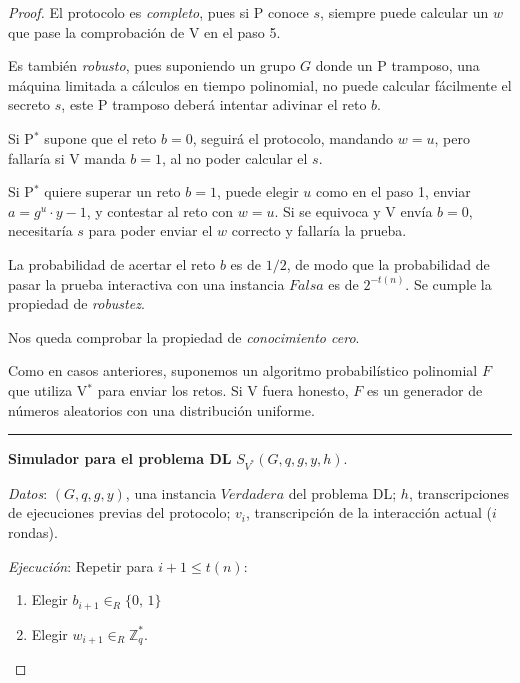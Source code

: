 \begin{proof}
	\hfil
	
	El protocolo es \textit{completo}, pues si P conoce $s$, siempre puede calcular un $w$ que pase la comprobación de V en el paso 5.
	
	\hfil
	
	Es también \textit{robusto}, pues suponiendo un grupo $G$ donde un P tramposo, una máquina limitada a cálculos en tiempo polinomial, no puede calcular fácilmente el secreto $s$, este P tramposo deberá intentar adivinar el reto $b$.
	
	Si P$^*$ supone que el reto $b=0$, seguirá el protocolo, mandando $w=u$, pero fallaría si V manda $b=1$, al no poder calcular el $s$.
	
	Si P$^*$ quiere superar un reto $b=1$, puede elegir $u$ como en el paso 1, enviar $a=g^u \cdot y-1$, y contestar al reto con $w=u$. Si se equivoca y V envía $b=0$, necesitaría $s$ para poder enviar el $w$ correcto y fallaría la prueba.
	
	La probabilidad de acertar el reto $b$ es de $1/2$, de modo que la probabilidad de pasar la prueba interactiva con una instancia $Falsa$ es de $2^{-t(n)}$. Se cumple la propiedad de \textit{robustez}.
	
	
	\hfil
	
	Nos queda comprobar la propiedad de \textit{conocimiento cero}.
	
	Como en casos anteriores, suponemos un algoritmo probabilístico polinomial $F$ que utiliza V$^*$ para enviar los retos. Si V fuera honesto, $F$ es un generador de números aleatorios con una distribución uniforme.
	
	
	
	\hfil 
			
	\rule{\textwidth}{1pt}
	
	\textbf{Simulador para el problema DL} $S_{V^*}(G, q, g, y, h)$.
	
	\hfil
	
	\textit{Datos}: \quad $(G, q, g, y)$, una instancia $Verdadera$ del problema DL; \quad $h$, transcripciones de ejecuciones previas del protocolo; \quad $v_i$, transcripción de la interacción actual ($i$ rondas).
	
	\textit{Ejecución}: Repetir para $i+1 \leq t(n)$:
	
	\begin{enumerate}
		\item Elegir $b_{i+1} \in_R \{0,\,1\}$
		
		\item Elegir $w_{i+1} \in_R \mathbb{Z}_q^*$.
		

\end{enumerate}
\end{proof}
